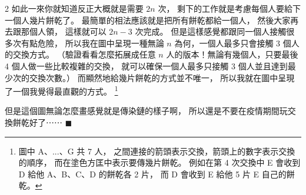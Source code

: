 \documentclass{article}
\begin{document}
\begin{multicols}{2}
如此一來你就知道反正大概就是需要 $2n$ 次，
剩下的工作就是考慮每個人要給下一個人幾片餅乾了。
最簡單的相法應該就是把所有餅乾都給一個人，
然後大家再去跟那個人領，
這樣就可以 $2n-3$ 次完成。
但是這樣感覺都跟同一個人接觸很多次有點危險，
所以我在圖中呈現一種無論 $n$ 為何，一個人最多只會接觸 3 個人的交換方式。
（驗證看看怎麼拓展成任意 $n$ 人的版本！無論有幾個人，只要最後 4 個人做一些比較複雜的交換，
就可以確保一個人最多只接觸 3 個人並且達到最少次的交換次數。）
而顯然地給幾片餅乾的方式並不唯一，
所以我就在圖中呈現了一個我覺得最直觀的方式。
	\footnote{圖中 A、...、G 共 7 人，
	之間連接的箭頭表示交換，箭頭上的數字表示交換的順序，
	而在塗色方匡中表示要傳幾片餅乾。
	例如在第 4 次交換中 E 會收到 D 給他 A、B、C、D 的餅乾各 2 片，
	而 D 會收到 E 給他 5 片 E 自己的餅乾。}

但是這個圖無論怎麼畫感覺就是傳染鏈的樣子啊，
所以還是不要在疫情期間玩交換餅乾好了⋯⋯
\hfill$\blacksquare$
\printbibliography[title={\normalsize{參考資料}}]
\end{multicols}
\end{document}
